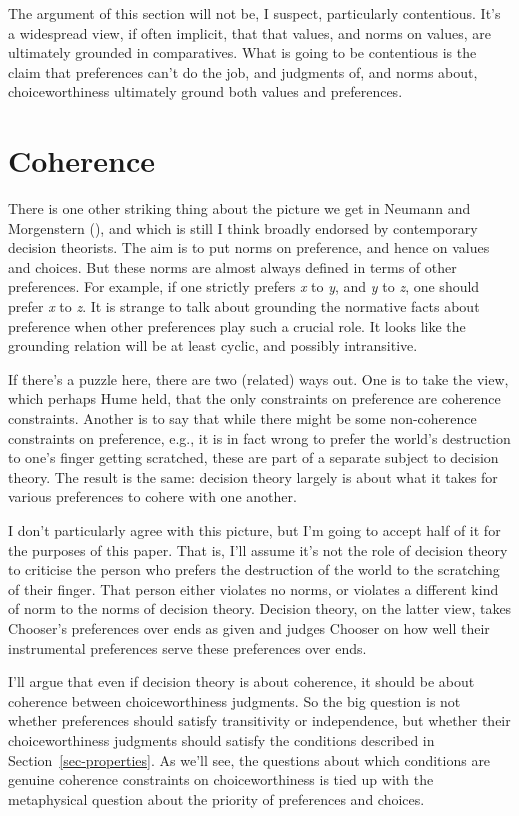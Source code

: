 \documentclass[
  11pt,
  letterpaper,
  DIV=11,
  numbers=noendperiod,
  twoside]{scrartcl}
\begin{document}
The argument of this section will not be, I suspect, particularly
contentious. It's a widespread view, if often implicit, that that
values, and norms on values, are ultimately grounded in comparatives.
What is going to be contentious is the claim that preferences can't do
the job, and judgments of, and norms about, choiceworthiness ultimately
ground both values and preferences.

\section{Coherence}\label{sec-coherence}

There is one other striking thing about the picture we get in Neumann
and Morgenstern (), and which is still I
think broadly endorsed by contemporary decision theorists. The aim is to
put norms on preference, and hence on values and choices. But these
norms are almost always defined in terms of other preferences. For
example, if one strictly prefers \emph{x} to \emph{y}, and \emph{y} to
\emph{z}, one should prefer \emph{x} to \emph{z}. It is strange to talk
about grounding the normative facts about preference when other
preferences play such a crucial role. It looks like the grounding
relation will be at least cyclic, and possibly intransitive.

If there's a puzzle here, there are two (related) ways out. One is to
take the view, which perhaps Hume held, that the only constraints on
preference are coherence constraints. Another is to say that while there
might be some non-coherence constraints on preference, e.g., it is in
fact wrong to prefer the world's destruction to one's finger getting
scratched, these are part of a separate subject to decision theory. The
result is the same: decision theory largely is about what it takes for
various preferences to cohere with one another.

I don't particularly agree with this picture, but I'm going to accept
half of it for the purposes of this paper. That is, I'll assume it's not
the role of decision theory to criticise the person who prefers the
destruction of the world to the scratching of their finger. That person
either violates no norms, or violates a different kind of norm to the
norms of decision theory. Decision theory, on the latter view, takes
Chooser's preferences over ends as given and judges Chooser on how well
their instrumental preferences serve these preferences over ends.

I'll argue that even if decision theory is about coherence, it should be
about coherence between choiceworthiness judgments. So the big question
is not whether preferences should satisfy transitivity or independence,
but whether their choiceworthiness judgments should satisfy the
conditions described in Section~\ref{sec-properties}. As we'll see, the
questions about which conditions are genuine coherence constraints on
choiceworthiness is tied up with the metaphysical question about the
priority of preferences and choices.
\end{document}
